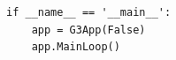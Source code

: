 \documentclass[12pt]{article}
\begin{document}
 {\footnotesize
   \resetlinenumber[78]
   \linenumbers
 \begin{verbatim}
if __name__ == '__main__':
    app = G3App(False)
    app.MainLoop()
 \end{verbatim}
 }

%
%







\end{document}
